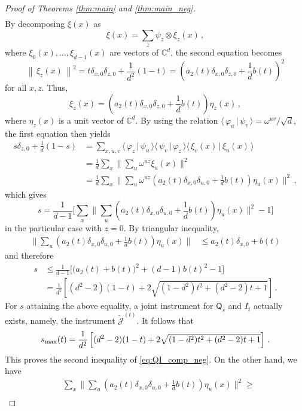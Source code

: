 \documentclass[12pt,reqno]{amsart}
\theoremstyle{definition}
\newcommand{\ip}[2]{\langle\,#1\,\vert\,#2\,\rangle} %
\newcommand{\no}[1]{\left\|\,#1\,\right\|} %
\newcommand{\Qo}{\mathsf{Q}}%
\newcommand{\phii}{\varphi} %
\newcommand{\Cb}{\mathbb{C}} %
\newcommand{\ii}{\mathcal{J}}
\begin{document}
\begin{proof}[Proof of Theorems \ref{thm:main} and \ref{thm:main_neg}]
\begin{equation*}
\begin{aligned}
\end{aligned}
\end{equation*}
By decomposing $\xi(x)$ as
$$
\xi(x) = \sum_z \psi_z\otimes\xi_z(x)\,,
$$
where $\xi_0(x),\ldots,\xi_{d-1}(x)$ are vectors of $\Cb^d$, the second equation becomes
$$
\no{\xi_z(x)}^2 = t\delta_{x,0}\delta_{z,0} + \frac{1}{d^2}(1-t) = \left(a_2(t)\delta_{x,0}\delta_{z,0} + \frac{1}{d} b(t)\right)^2
$$
for all $x,z$. Thus,
$$
\xi_z(x) = \left(a_2(t)\delta_{x,0}\delta_{z,0} + \frac{1}{d} b(t)\right) \eta_z(x)\,,
$$
where $\eta_z(x)$ is a unit vector of $\Cb^d$. By using the relation $\ip{\phii_u}{\psi_v} = \omega^{uv}/\sqrt{d}$, the first equation then yields
\begin{align*}
s\delta_{z,0} + \frac{1}{d}(1-s) & = \sum_{x,u,v} \ip{\phii_z}{\psi_u} \ip{\psi_v}{\phii_z} \ip{\xi_v(x)}{\xi_u(x)} \\
& = \frac{1}{d} \sum_x \bigg\|\sum_u \omega^{uz} \xi_u(x)\bigg\|^2 \\
& = \frac{1}{d} \sum_x \bigg\|\sum_u \omega^{uz} \left(a_2(t)\delta_{x,0}\delta_{u,0} + \frac{1}{d} b(t)\right) \eta_u(x)\bigg\|^2\,,
\end{align*}
which gives
$$
s = \frac{1}{d-1} \bigg[ \sum_x \bigg\|\sum_u \left(a_2(t)\delta_{x,0}\delta_{u,0} + \frac{1}{d} b(t)\right) \eta_u(x)\bigg\|^2 - 1 \bigg]
$$
in the particular case with $z=0$. By triangular inequality,
\begin{align*}
\bigg\|\sum_u \left(a_2(t)\delta_{x,0}\delta_{u,0} + \frac{1}{d} b(t)\right) \eta_u(x)\bigg\| & \leq a_2(t)\delta_{x,0} + b(t)
\end{align*}
and therefore
\begin{align*}
s & \leq \frac{1}{d-1} \big[ \big(a_2(t) + b(t)\big)^2 + (d-1)b(t)^2 - 1 \big] \\
& = \frac{1}{d^2}\left[(d^2 - 2) (1 - t) + 2\sqrt{(1 - d^2) t^2 + (d^2 - 2) t + 1}\right]\,.
\end{align*}
For $s$ attaining the above equality, a joint instrument for $\Qo_s$ and $I_t$ actually exists, namely, the instrument $\tilde{\ii}^{(t)}$. It follows that
$$
s_{\rm max}(t) = \frac{1}{d^2}\left[(d^2 - 2) (1 - t) + 2\sqrt{(1 - d^2) t^2 + (d^2 - 2) t + 1}\right]\,.
$$
This proves the second inequality of \eqref{eq:QI_comp_neg}. On the other hand, we have
\begin{align*}
& \sum_x \bigg\|\sum_u \left(a_2(t)\delta_{x,0}\delta_{u,0} + \frac{1}{d} b(t)\right) \eta_u(x)\bigg\|^2 \geq \\

\end{align*}
\end{proof}
\end{document}
